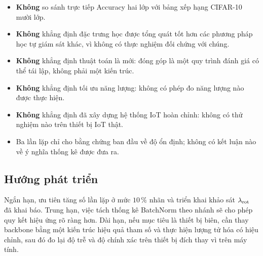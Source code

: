 \begin{itemize}[leftmargin=1.2cm,itemsep=3pt]
  \item \textbf{Không} so sánh trực tiếp Accuracy hai lớp với bảng xếp hạng CIFAR-10 mười lớp.
  \item \textbf{Không} khẳng định đặc trưng học được tổng quát tốt hơn các phương pháp học tự
        giám sát khác, vì không có thực nghiệm đối chứng với chúng.
  \item \textbf{Không} khẳng định thuật toán là mới: đóng góp là một quy trình đánh giá có thể
        tái lập, không phải một kiến trúc.
  \item \textbf{Không} khẳng định tối ưu năng lượng: không có phép đo năng lượng nào được thực
        hiện.
  \item \textbf{Không} khẳng định đã xây dựng hệ thống IoT hoàn chỉnh: không có thử nghiệm nào
        trên thiết bị IoT thật.
  \item Ba lần lặp chỉ cho bằng chứng ban đầu về độ ổn định; không có kết luận nào về ý nghĩa
        thống kê được đưa ra.
\end{itemize}

\subsection{Hướng phát triển}
\label{sec:concl-future}

Ngắn hạn, ưu tiên tăng số lần lặp ở mức $10\,\%$ nhãn và triển khai khảo sát $\lambda_{\mathrm{rot}}$ đã khai
báo. Trung hạn, việc tách thống kê BatchNorm theo nhánh sẽ cho phép quy kết hiệu ứng rõ ràng
hơn. Dài hạn, nếu mục tiêu là thiết bị biên, cần thay backbone bằng một kiến trúc hiệu quả tham
số và thực hiện lượng tử hóa có hiệu chỉnh, sau đó đo lại độ trễ và độ chính xác trên thiết bị
đích thay vì trên máy tính.
